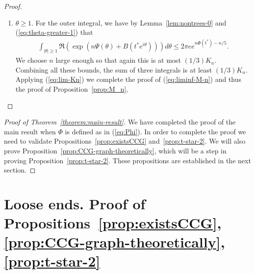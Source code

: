 \documentclass[12pt]{article}
\begin{document}
\begin{proof}
\begin{enumerate}
\item $\theta\ge 1$. For the outer integral, we have by Lemma~\ref{lem:nontrees-0} and (\ref{eq:theta-greater-1})  that
\begin{align*}
\int_{|\theta| \geq 1}\Re(\exp(n\Psi(\theta)+B(t^*e^{i\theta})))d\theta 
\le
2\pi e e^{n\Phi(t^*) - n/5}.
\end{align*}
We choose $n$ large  enough so that again this is at most $(1/3)K_n$.
Combining all these bounds, the sum of three integrals is at least $(1/3)K_n$. Applying (\ref{eq:lim-Kn}) we complete the proof of (\ref{eq:liminf-M-n})
and thus the proof of Proposition~\ref{prop:M_n},
\end{enumerate}
\end{proof}


\begin{proof}[Proof of Theorem~\ref{theorem:main-result}]
We have completed the proof of the main result when $\Phi$ is defined as in (\ref{eq:Phi}). 
In order to complete the proof we need to validate Propositions~\ref{prop:existsCCG} and~\ref{prop:t-star-2}.  We will also prove
Proposition~\ref{prop:CCG-graph-theoretically}, which will be a step in proving Proposition~\ref{prop:t-star-2}.
These propositions are established in the next section.
\end{proof}

\section{Loose ends. Proof of Propositions~\ref{prop:existsCCG},\ref{prop:CCG-graph-theoretically},\ref{prop:t-star-2}}
\label{section:loose-ends}
\end{document}
